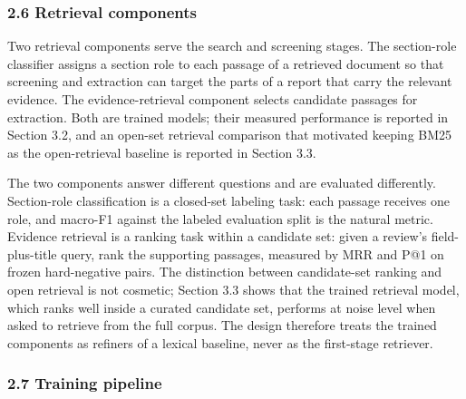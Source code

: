 \documentclass[
]{article}
\begin{document}
\subsubsection{2.6 Retrieval components}\label{retrieval-components}

Two retrieval components serve the search and screening stages. The
section-role classifier assigns a section role to each passage of a
retrieved document so that screening and extraction can target the parts
of a report that carry the relevant evidence. The evidence-retrieval
component selects candidate passages for extraction. Both are trained
models; their measured performance is reported in Section 3.2, and an
open-set retrieval comparison that motivated keeping BM25 as the
open-retrieval baseline is reported in Section 3.3.

The two components answer different questions and are evaluated
differently. Section-role classification is a closed-set labeling task:
each passage receives one role, and macro-F1 against the labeled
evaluation split is the natural metric. Evidence retrieval is a ranking
task within a candidate set: given a review's field-plus-title query,
rank the supporting passages, measured by MRR and P@1 on frozen
hard-negative pairs. The distinction between candidate-set ranking and
open retrieval is not cosmetic; Section 3.3 shows that the trained
retrieval model, which ranks well inside a curated candidate set,
performs at noise level when asked to retrieve from the full corpus. The
design therefore treats the trained components as refiners of a lexical
baseline, never as the first-stage retriever.

\subsubsection{2.7 Training pipeline}\label{training-pipeline}
\end{document}
